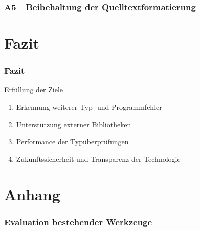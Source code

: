       \begin{frame}
        \frametitle{A5~~Beibehaltung der Quelltextformatierung}
      \end{frame}

  \section{Fazit}

    \begin{frame}
      \frametitle{Fazit}

      \begin{block}{Erfüllung der Ziele}
        \begin{enumerate}
          \item Erkennung weiterer Typ- und Programmfehler
          \item Unterstützung externer Bibliotheken
          \item Performance der Typüberprüfungen
          \item Zukunftssicherheit und Transparenz der Technologie
        \end{enumerate}
      \end{block}
    \end{frame}

  \appendix

    \begin{frame}
    \end{frame}

  \section{Anhang}

    \begin{frame}[noframenumbering]
      \frametitle{Evaluation bestehender Werkzeuge}
      
    \end{frame}



